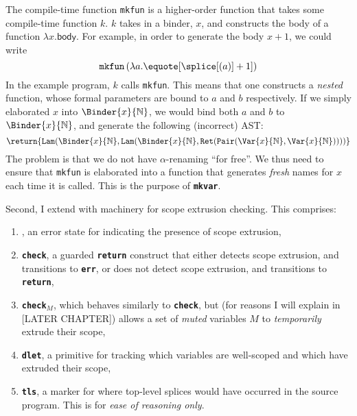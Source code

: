 \begin{enumerate}
The compile-time function \texttt{mkfun} is a higher-order function that takes some compile-time function $k$. $k$ takes in a binder, $x$, and constructs the \textsf{body} of a function $\lambda x. \textsf{body}$. For example, in order to generate the body $x + 1$, we could write 
\[\texttt{mkfun} \,  (\lambda a. \equote[{\splice[(a)]} + 1]) \]
In the example \sourceLang{} program, $k$ calls \texttt{mkfun}. This means that one constructs a \textit{nested} function, whose formal parameters are bound to $a$ and $b$ respectively. If we simply elaborated $x$ into $\Binder{x}{\mathbb{N}}$, we would bind both $a$ and $b$ to $\Binder{x}{\mathbb{N}}$, and generate the following (incorrect) AST: 
 \[\return{\texttt{Lam}(\Binder{x}{\mathbb{N}}, \texttt{Lam}(\Binder{x}{\mathbb{N}}, \texttt{Ret}(\texttt{Pair}(\Var{x}{\mathbb{N}}, \Var{x}{\mathbb{N}}))))}\]
 The problem is that we do not have $\alpha$-renaming ``for free''. We thus need to ensure that \texttt{mkfun} is elaborated into a function that generates \textit{fresh} names for $x$ each time it is called. This is the purpose of \textbf{\texttt{mkvar}}. 
\end{enumerate}

Second, I extend \efflang{} with machinery for scope extrusion checking. This comprises:
\begin{enumerate}
\item \err{}, an error state for indicating the presence of scope extrusion,
\item \textbf{\texttt{check}}, a guarded \textbf{\texttt{return}} construct that either detects scope extrusion, and transitions to \textbf{\texttt{err}}, or does not detect scope extrusion, and transitions to \textbf{\texttt{return}},
\item \textbf{\texttt{check$_M$}}, which behaves similarly to \textbf{\texttt{check}}, but (for reasons I will explain in [LATER CHAPTER]) allows a set of \textit{muted} variables $M$ to \textit{temporarily} extrude their scope,
\item \textbf{\texttt{dlet}}, a primitive for tracking which variables are well-scoped and which have extruded their scope,
\item \textbf{\texttt{tls}}, a marker for where top-level splices would have occurred in the source program. This is for \textit{ease of reasoning only}. 
\end{enumerate}

